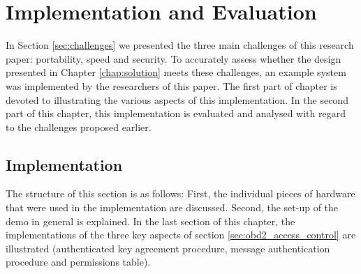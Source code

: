 
\chapter{Implementation and Evaluation}
\label{chap:implementation}

In Section \ref{sec:challenges} we presented the three main challenges of this research paper: portability, speed and security. To accurately assess whether the design presented in Chapter \ref{chap:solution} meets these challenges, an example system was implemented by the researchers of this paper. The first part of chapter is devoted to illustrating the various aspects of this implementation. In the second part of this chapter, this implementation is evaluated and analysed with regard to the challenges proposed earlier. 

\section{Implementation}
\label{sec:implementation}

The structure of this section is as follows: First, the individual pieces of hardware that were used in the implementation are discussed. Second, the set-up of the demo in general is explained. In the last section of this chapter, the implementations of the three key aspects of section \ref{sec:obd2_access_control} are illustrated (authenticated key agreement procedure, message authentication procedure and permissions table).


